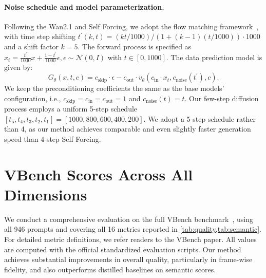 \paragraph{Noise schedule and model parameterization.}
Following the Wan2.1 and Self Forcing, we adopt the flow matching framework~\citep{lipman2022flow, liu2022flow}, with time step shifting $t^\prime(k, t) = (kt / 1000) / (1 + (k-1)(t / 1000)) \cdot 1000$ and a shift factor $k=5$. The forward process is specified as $x_t = \frac{t^\prime}{1000} x + \frac{1 - t^\prime}{1000} \epsilon, \epsilon \sim \mathcal{N}(0, I)$ with $t \in [0, 1000]$.
The data prediction model is given by:
\begin{equation}
    G_\theta(x, t, c) = c_{\text{skip}} \cdot \epsilon - c_{\text{out}} \cdot v_\theta(c_{\text{in}} \cdot x_t, c_{\text{noise}}(t^\prime), c).
\end{equation}
We keep the preconditioning coefficients the same as the base models' configuration, i.e., $c_{\text{skip}} = c_{\text{in}} = c_{\text{out}} = 1$ and $c_{\text{noise}}(t) = t$.
Our few-step diffusion process employs a uniform 5-step schedule $[t_5, t_4, t_3, t_2, t_1]=[1000, 800, 600, 400, 200]$. We adopt a 5-step schedule rather than 4, as our method achieves comparable and even slightly faster generation speed than 4-step Self Forcing.









\section{VBench Scores Across All Dimensions}





We conduct a comprehensive evaluation on the full VBench benchmark~\citep{huang2024vbench}, using all 946 prompts and covering all 16 metrics reported in \cref{tab:quality,tab:semantic}. For detailed metric definitions, we refer readers to the VBench paper. All values are computed with the official standardized evaluation scripts. Our method achieves substantial improvements in overall quality, particularly in frame-wise fidelity, and also outperforms distilled baselines on semantic scores.

